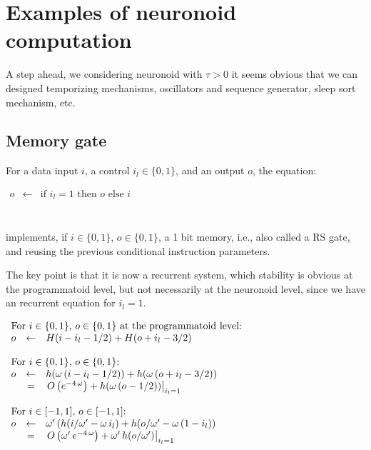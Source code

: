 \documentclass[a4]{article}
\newcommand{\eqline}[1]{~\vspace{0.1cm}\\\centerline{$#1$}\vspace{0.1cm}\\}
\begin{document}
\section{Examples of neuronoid computation}

A step ahead, we considering neuronoid with $\tau > 0$ it seems obvious that we can designed temporizing mechanisms, oscillators and sequence generator, sleep sort mechanism, etc.

\subsection{Memory gate}

For a data input $i$, a control $i_l \in \{0, 1\}$, and an output $o$, the equation:
\eqline{\begin{array}{rcl}
    o &\leftarrow& \mbox{if } i_l = 1 \mbox{ then } o \mbox{ else } i \\
\end{array}}
implements, if $i \in \{0, 1\}$, $o \in \{0, 1\}$, a 1 bit memory, i.e., also called a RS gate, and reusing the previous conditional instruction parameters.

The key point is that it is now a recurrent system, which stability is obvious at the programmatoid level,
but not necessarily at the neuronoid level, since we have an recurrent equation for $i_l = 1$.
\eqline{\begin{array}{rcl}
     \multicolumn{3}{l}{\mbox{For $i \in \{0, 1\}$, $o \in \{0, 1\}$ at the programmatoid level:}} \\
     o &\leftarrow& H(i - i_l - 1/2) + H(o + i_l - 3/2) \\
    &&\\\multicolumn{3}{l}{\mbox{For $i \in \{0, 1\}$, $o \in \{0, 1\}$:}} \\
     o &\leftarrow& h(\omega \, (i - i_l - 1/2) ) + h(\omega \, (o + i_l - 3/2)) \\
    &=& \left. O\left(e^{-4\,\omega}\right) + h(\omega \, (o  - 1/2)) \right|_{i_l = 1} \\
    &&\\\multicolumn{3}{l}{\mbox{For $i \in [-1, 1]$, $o \in [-1, 1]$:}} \\
    o &\leftarrow& \omega' \, (h(i/\omega' -  \omega \, i_l) + h(o /\omega' -  \omega \, (1 - i_l)) \\
    &=& \left. O\left(\omega' \, e^{-4\,\omega}\right) + \omega' \, h(o/\omega') \right|_{i_l = 1} \\
\end{array}}
\end{document}

